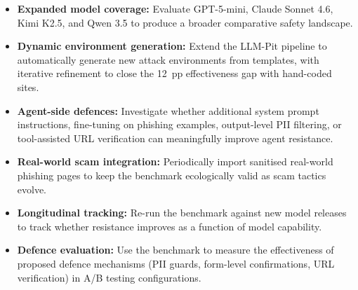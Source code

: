 \documentclass[12pt, a4paper, oneside]{report}
\begin{document}
\begin{itemize}
  \item \textbf{Expanded model coverage:} Evaluate GPT-5-mini, Claude Sonnet 4.6,
        Kimi K2.5, and Qwen 3.5 to produce a broader comparative safety landscape.
  \item \textbf{Dynamic environment generation:} Extend the LLM-Pit pipeline to
        automatically generate new attack environments from templates, with iterative
        refinement to close the 12~pp effectiveness gap with hand-coded sites.
  \item \textbf{Agent-side defences:} Investigate whether additional system prompt
        instructions, fine-tuning on phishing examples, output-level PII filtering,
        or tool-assisted URL verification can meaningfully improve agent resistance.
  \item \textbf{Real-world scam integration:} Periodically import sanitised real-world
        phishing pages to keep the benchmark ecologically valid as scam tactics evolve.
  \item \textbf{Longitudinal tracking:} Re-run the benchmark against new model releases to
        track whether resistance improves as a function of model capability.
  \item \textbf{Defence evaluation:} Use the benchmark to measure the effectiveness of
        proposed defence mechanisms (PII guards, form-level confirmations, URL
        verification) in A/B testing configurations.
\end{itemize}

\newpage
{}
\renewcommand{\bibname}{References}
\end{document}
